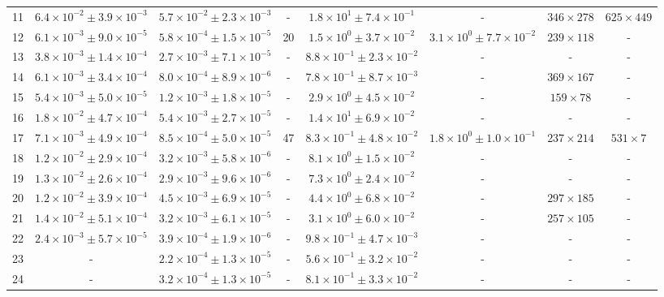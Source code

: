 \begin{table}
\begin{tabular}{cccccccc}
11 & $6.4\times10^{-2}\pm 3.9\times10^{-3}$ & $5.7\times10^{-2}\pm 2.3\times10^{-3}$ & - & $1.8\times10^{1}\pm 7.4\times10^{-1}$ & - & $346\times 278$ & $625\times 449$ \\
12 & $6.1\times10^{-3}\pm 9.0\times10^{-5}$ & $5.8\times10^{-4}\pm 1.5\times10^{-5}$ & 20 & $1.5\times10^{0}\pm 3.7\times10^{-2}$ & $3.1\times10^{0}\pm 7.7\times10^{-2}$ & $239\times 118$ & - \\
13 & $3.8\times10^{-3}\pm 1.4\times10^{-4}$ & $2.7\times10^{-3}\pm 7.1\times10^{-5}$ & - & $8.8\times10^{-1}\pm 2.3\times10^{-2}$ & - & - & - \\
14 & $6.1\times10^{-3}\pm 3.4\times10^{-4}$ & $8.0\times10^{-4}\pm 8.9\times10^{-6}$ & - & $7.8\times10^{-1}\pm 8.7\times10^{-3}$ & - & $369\times 167$ & - \\
15 & $5.4\times10^{-3}\pm 5.0\times10^{-5}$ & $1.2\times10^{-3}\pm 1.8\times10^{-5}$ & - & $2.9\times10^{0}\pm 4.5\times10^{-2}$ & - & $159\times 78$ & - \\
16 & $1.8\times10^{-2}\pm 4.7\times10^{-4}$ & $5.4\times10^{-3}\pm 2.7\times10^{-5}$ & - & $1.4\times10^{1}\pm 6.9\times10^{-2}$ & - & - & - \\
17 & $7.1\times10^{-3}\pm 4.9\times10^{-4}$ & $8.5\times10^{-4}\pm 5.0\times10^{-5}$ & 47 & $8.3\times10^{-1}\pm 4.8\times10^{-2}$ & $1.8\times10^{0}\pm 1.0\times10^{-1}$ & $237\times 214$ & $531\times 7$ \\
18 & $1.2\times10^{-2}\pm 2.9\times10^{-4}$ & $3.2\times10^{-3}\pm 5.8\times10^{-6}$ & - & $8.1\times10^{0}\pm 1.5\times10^{-2}$ & - & - & - \\
19 & $1.3\times10^{-2}\pm 2.6\times10^{-4}$ & $2.9\times10^{-3}\pm 9.6\times10^{-6}$ & - & $7.3\times10^{0}\pm 2.4\times10^{-2}$ & - & - & - \\
20 & $1.2\times10^{-2}\pm 3.9\times10^{-4}$ & $4.5\times10^{-3}\pm 6.9\times10^{-5}$ & - & $4.4\times10^{0}\pm 6.8\times10^{-2}$ & - & $297\times 185$ & - \\
21 & $1.4\times10^{-2}\pm 5.1\times10^{-4}$ & $3.2\times10^{-3}\pm 6.1\times10^{-5}$ & - & $3.1\times10^{0}\pm 6.0\times10^{-2}$ & - & $257\times 105$ & - \\
22 & $2.4\times10^{-3}\pm 5.7\times10^{-5}$ & $3.9\times10^{-4}\pm 1.9\times10^{-6}$ & - & $9.8\times10^{-1}\pm 4.7\times10^{-3}$ & - & - & - \\
23 & - & $2.2\times10^{-4}\pm 1.3\times10^{-5}$ & - & $5.6\times10^{-1}\pm 3.2\times10^{-2}$ & - & - & - \\
24 & - & $3.2\times10^{-4}\pm 1.3\times10^{-5}$ & - & $8.1\times10^{-1}\pm 3.3\times10^{-2}$ & - & - & - \\

\end{tabular}
\end{table}
